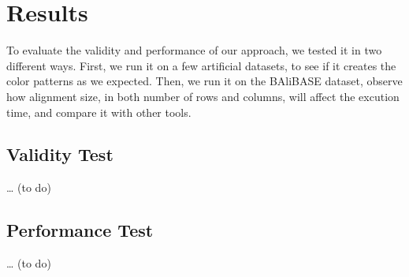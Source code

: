 \chapter{Results}\label{chap:Results}

To evaluate the validity and performance of our approach, we tested it in two different ways. First, we run it on a few artificial datasets, to see if it creates the color patterns as we expected. Then, we run it on the BAliBASE dataset, observe how alignment size, in both number of rows and columns, will affect the excution time, and compare it with other tools.

\section{Validity Test}

… (to do)

\section{Performance Test}

… (to do)